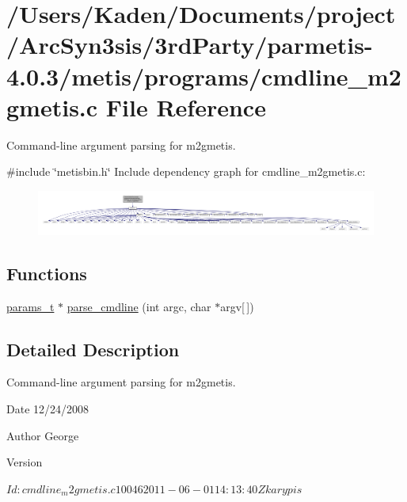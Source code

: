 \hypertarget{a00299}{}\section{/\+Users/\+Kaden/\+Documents/project/\+Arc\+Syn3sis/3rd\+Party/parmetis-\/4.0.3/metis/programs/cmdline\+\_\+m2gmetis.c File Reference}
\label{a00299}


Command-\/line argument parsing for m2gmetis.  


{\ttfamily \#include \char`\"{}metisbin.\+h\char`\"{}}\newline
Include dependency graph for cmdline\+\_\+m2gmetis.\+c\+:\nopagebreak
\begin{figure}[H]
\begin{center}
\leavevmode
\includegraphics[width=350pt]{a00300}
\end{center}
\end{figure}
\subsection*{Functions}
\begin{DoxyCompactItemize}
\item 
\hyperlink{a00706}{params\+\_\+t} $\ast$ \hyperlink{a00299_a0e7ce196a2f8882777957bf898739f6f}{parse\+\_\+cmdline} (int argc, char $\ast$argv\mbox{[}$\,$\mbox{]})
\end{DoxyCompactItemize}


\subsection{Detailed Description}
Command-\/line argument parsing for m2gmetis. 

\begin{DoxyDate}{Date}
12/24/2008 
\end{DoxyDate}
\begin{DoxyAuthor}{Author}
George 
\end{DoxyAuthor}
\begin{DoxyVersion}{Version}
\begin{DoxyVerb}$Id: cmdline_m2gmetis.c 10046 2011-06-01 14:13:40Z karypis $\end{DoxyVerb}
 
\end{DoxyVersion}


